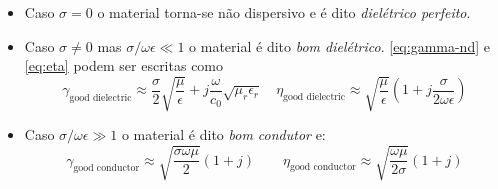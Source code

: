 
\vspace{1.1em}
\begin{itemize}
    \item Caso $\sigma = 0$ o material torna-se não dispersivo e é dito \textit{dielétrico perfeito}.

    \item Caso $\sigma \neq 0$ mas $\sigma/\omega\epsilon \ll 1$ o material é dito \textit{bom dielétrico}. \eqref{eq:gamma-nd} e \eqref{eq:eta} podem ser escritas como
    \begin{equation}
        \gamma_{\text{good dielectric}} \approx \boxed{\dfrac{\sigma}{2}\sqrt{\frac{\mu}{\epsilon}} + j\frac{\omega}{c_0}\sqrt{\mu_r\epsilon_r}}\quad
        \eta_{\text{good dielectric}} \approx \boxed{\sqrt{\frac{\mu}{\epsilon}}\left(1+j\frac{\sigma}{2\omega\epsilon}\right)}
    \end{equation}

    \item Caso $\sigma/\omega\epsilon \gg 1$ o material é dito \textit{bom condutor} e: 
    \begin{equation}
        \gamma_{\text{good conductor}} \approx \boxed{\sqrt{\frac{\sigma\omega\mu}{2}}(1+j)}\qquad
        \eta_{\text{good conductor}} \approx \boxed{\sqrt{\frac{\omega\mu}{2\sigma}}(1+j)}
    \end{equation}
\end{itemize}

